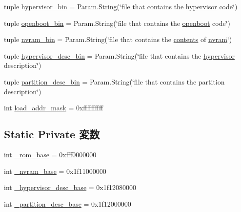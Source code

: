 \begin{DoxyCompactItemize}
\item 
tuple \hyperlink{classSparcSystem_1_1SparcSystem_aff5b3420b8f86ead7be9581df53c2309}{hypervisor\_\-bin} = Param.String(\char`\"{}file that contains the \hyperlink{classSparcSystem_a693eeebf890fe16aa181edba9fc1c542}{hypervisor} code\char`\"{})
\item 
tuple \hyperlink{classSparcSystem_1_1SparcSystem_a63c9491b9f9c4adbe9e595e2cc479c4f}{openboot\_\-bin} = Param.String(\char`\"{}file that contains the \hyperlink{classSparcSystem_a8c9bace2c61d3c341b5b2ec031d09b9c}{openboot} code\char`\"{})
\item 
tuple \hyperlink{classSparcSystem_1_1SparcSystem_a55a83092d14516c005d89ee782768dbb}{nvram\_\-bin} = Param.String(\char`\"{}file that contains the \hyperlink{x86_2linux_2syscalls_8cc_a8ef5c6d6f5c464eb06802bd7aecff6f9}{contents} of \hyperlink{classSparcSystem_a2e5918976373473601e9423650ed3df9}{nvram}\char`\"{})
\item 
tuple \hyperlink{classSparcSystem_1_1SparcSystem_a07e6b2d2275f41491b1c95fd0a4641b2}{hypervisor\_\-desc\_\-bin} = Param.String(\char`\"{}file that contains the \hyperlink{classSparcSystem_a693eeebf890fe16aa181edba9fc1c542}{hypervisor} description\char`\"{})
\item 
tuple \hyperlink{classSparcSystem_1_1SparcSystem_ae5417df2a867ff189d8e89954258a521}{partition\_\-desc\_\-bin} = Param.String(\char`\"{}file that contains the partition description\char`\"{})
\item 
int \hyperlink{classSparcSystem_1_1SparcSystem_abd9c5cc6b7da624a69344d571bab1038}{load\_\-addr\_\-mask} = 0xffffffffff
\end{DoxyCompactItemize}
\subsection*{Static Private 変数}
\begin{DoxyCompactItemize}
\item 
int \hyperlink{classSparcSystem_1_1SparcSystem_acecae3b3adc0067eb514a0643bc5a8ea}{\_\-rom\_\-base} = 0xfff0000000
\item 
int \hyperlink{classSparcSystem_1_1SparcSystem_aead1dcfc9870a16691308d3a077d8bdc}{\_\-nvram\_\-base} = 0x1f11000000
\item 
int \hyperlink{classSparcSystem_1_1SparcSystem_ace9e00fa401899369bbbc2b280d2d28f}{\_\-hypervisor\_\-desc\_\-base} = 0x1f12080000
\item 
int \hyperlink{classSparcSystem_1_1SparcSystem_ab7af837286296fcb55965eb109a74d7c}{\_\-partition\_\-desc\_\-base} = 0x1f12000000
\end{DoxyCompactItemize}


